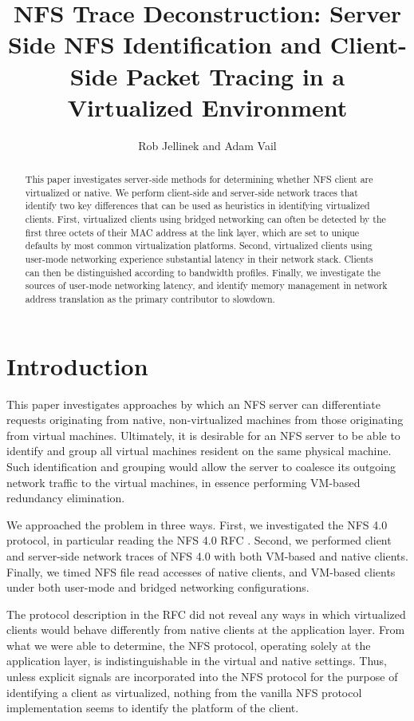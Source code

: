 \documentclass[11pt,pdftex,twocolumn]{article}
\title{NFS Trace Deconstruction: 
Server Side NFS Identification and Client-Side Packet Tracing in a Virtualized Environment}
\author{Rob Jellinek and Adam Vail}
\begin{document}
\maketitle

\begin{abstract}
This paper investigates server-side methods for determining whether NFS client are virtualized or native. We perform client-side and server-side network traces that identify two key differences that can be used as heuristics in identifying virtualized clients. First, virtualized clients using bridged networking can often be detected by the first three octets of their MAC address at the link layer, which are set to unique defaults by most common virtualization platforms. Second, virtualized clients using user-mode networking experience substantial latency in their network stack. Clients can then be distinguished according to bandwidth profiles. Finally, we investigate the sources of user-mode networking latency, and identify memory management in network address translation as the primary contributor to slowdown.
\end{abstract}

\section{Introduction}
This paper investigates approaches by which an NFS server can differentiate requests originating from native, non-virtualized machines from those originating from virtual machines. Ultimately, it is desirable for an NFS server to be able to identify and group all virtual machines resident on the same physical machine. Such identification and grouping would allow the server to coalesce its outgoing network traffic to the virtual machines, in essence performing VM-based redundancy elimination.

We approached the problem in three ways. First, we investigated the NFS 4.0 protocol, in particular reading the NFS 4.0 RFC \cite{shepler2003network}. Second, we performed client and server-side network traces of NFS 4.0 with both VM-based and native clients. Finally, we timed NFS file read accesses of native clients, and VM-based clients under both user-mode and bridged networking configurations.

The protocol description in the RFC did not reveal any ways in which virtualized clients would behave differently from native clients at the application layer. From what we were able to determine, the NFS protocol, operating solely at the application layer, is indistinguishable in the virtual and native settings. Thus, unless explicit signals are incorporated into the NFS protocol for the purpose of identifying a client as virtualized, nothing from the vanilla NFS protocol implementation seems to identify the platform of the client. 
\end{document}

